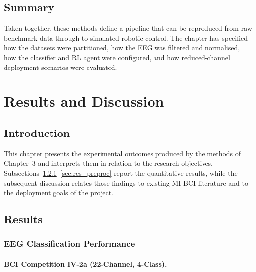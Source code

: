 \documentclass[12pt, a4paper]{article}
\begin{document}
\subsection{Summary}

Taken together, these methods define a pipeline that can be reproduced from raw benchmark data through to simulated robotic control. The chapter has specified how the datasets were partitioned, how the EEG was filtered and normalised, how the classifier and RL agent were configured, and how reduced-channel deployment scenarios were evaluated.

\section{Results and Discussion}

\subsection{Introduction}

This chapter presents the experimental outcomes produced by the methods of Chapter~3 and interprets them in relation to the research objectives. Subsections~\ref{sec:res_class}--\ref{sec:res_preproc} report the quantitative results, while the subsequent discussion relates those findings to existing MI-BCI literature and to the deployment goals of the project.

\subsection{Results}

\subsubsection{EEG Classification Performance}
\label{sec:res_class}

\paragraph{BCI Competition IV-2a (22-Channel, 4-Class).}
\end{document}

